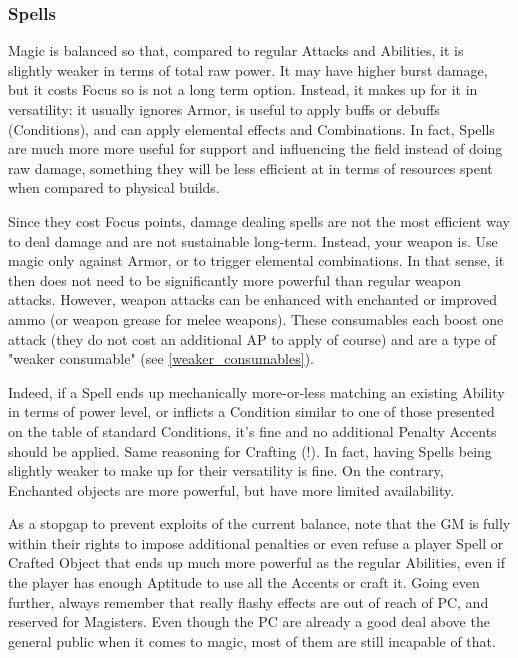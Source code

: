 

\subsubsection{Spells}
\label{balancing_spells}

Magic is balanced so that, compared to regular Attacks and Abilities, it is slightly weaker in terms of total raw power. It may have higher burst damage, but it costs Focus so is not a long term option. Instead, it makes up for it in versatility: it usually ignores Armor, is useful to apply buffs or debuffs (Conditions), and can apply elemental effects and Combinations. In fact, Spells are much more more useful for support and influencing the field instead of doing raw damage, something they will be less efficient at in terms of resources spent when compared to physical builds.

Since they cost Focus points, damage dealing spells are not the most efficient way to deal damage and are not sustainable long-term. Instead, your weapon is. Use magic only against Armor, or to trigger elemental combinations. In that sense, it then does not need to be significantly more powerful than regular weapon attacks. However, weapon attacks can be enhanced with enchanted or improved ammo (or weapon grease for melee weapons). These consumables each boost one attack (they do not cost an additional AP to apply of course) and are a type of "weaker consumable" (see \ref{weaker_consumables}).


Indeed, if a Spell ends up mechanically more-or-less matching an existing Ability in terms of power level, or inflicts a Condition similar to one of those presented on the table of standard Conditions, it's fine and no additional Penalty Accents should be applied. Same reasoning for Crafting (!). In fact, having Spells being slightly weaker to make up for their versatility is fine. On the contrary, Enchanted objects are more powerful, but have more limited availability.

As a stopgap to prevent exploits of the current balance, note that the GM is fully within their rights to impose additional penalties or even refuse a player Spell or Crafted Object that ends up much more powerful as the regular Abilities, even if the player has enough Aptitude to use all the Accents or craft it. Going even further, always remember that really flashy effects are out of reach of PC, and reserved for Magisters. Even though the PC are already a good deal above the general public when it comes to magic, most of them are still incapable of that.


